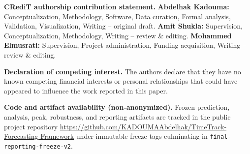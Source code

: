 \documentclass[11pt,a4paper]{article}
\begin{document}
\vspace{1em}
\noindent\textbf{CRediT authorship contribution statement.}
\textbf{Abdelhak Kadouma:} Conceptualization, Methodology, Software, Data
curation, Formal analysis, Validation, Visualization, Writing -- original draft.
\textbf{Amit Shukla:} Supervision, Conceptualization, Methodology, Writing --
review \& editing.
\textbf{Mohammed Elmusrati:} Supervision, Project administration, Funding
acquisition, Writing -- review \& editing.

\vspace{1em}
\noindent\textbf{Declaration of competing interest.}
The authors declare that they have no known competing financial interests or
personal relationships that could have appeared to influence the work reported
in this paper.

\vspace{1em}
\noindent\textbf{Code and artifact availability (non-anonymized).}
Frozen prediction, analysis, peak, robustness, and reporting artifacts are
tracked in the public project repository
\url{https://github.com/KADOUMAAbdelhak/TimeTrack-Forecasting-Framework}
under immutable freeze tags culminating in
\texttt{final-reporting-freeze-v2}.
\end{document}
